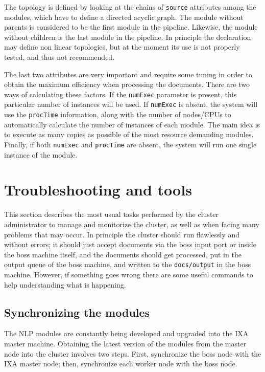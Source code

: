 \documentclass[a4]{article}
\begin{document}
The topology is defined by looking at the chains of \texttt{source}
attributes among the modules, which have to define a directed acyclic
graph. The module without parents is considered to be the first module in
the pipeline. Likewise, the module without children is the last module in
the pipeline. In principle the declaration may define non linear topologies,
but at the moment its use is not properly tested, and thus not recommended.

The last two attributes are very important and require some tuning in order
to obtain the maximum efficiency when processing the documents. There are
two ways of calculating these factors. If the \texttt{numExec} parameter is
present, this particular number of instances will be used. If
\texttt{numExec} is absent, the system will use the \texttt{procTime}
information, along with the number of nodes/CPUs to automatically calculate
the number of instances of each module. The main idea is to execute as many
copies as possible of the most resource demanding modules. Finally, if both
\texttt{numExec} and \texttt{procTime} are absent, the system will run one
single instance of the module.


\section{Troubleshooting and tools}
\label{sec:troubl-tools}

This section describes the most usual tasks performed by the cluster
administrator to manage and monitorize the cluster, as well as when facing
many problems that may occur. In principle the cluster should run flawlessly
and without errors; it should just accept documents via the boss input port
or inside the boss machine itself, and the documents should get processed,
put in the output queue of the boss machine, and written to the
\texttt{docs/output} in the boss machine. However, if something goes wrong
there are some useful commands to help understanding what is happening.



\subsection{Synchronizing the modules}
\label{sec:synchr-modul}

The NLP modules are constantly being developed and upgraded into the IXA
master machine. Obtaining the latest version of the modules from the master
node into the cluster involves two steps. First, synchronize the boss node
with the IXA master node; then, synchronize each worker node with the boss
node.
\end{document}
